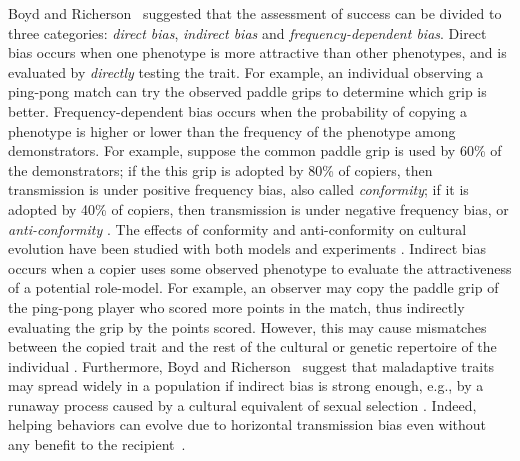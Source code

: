 \documentclass[12pt]{extarticle}
\begin{document}
Boyd and Richerson~\citep[Ch.~5]{evolutionBook} suggested that the assessment of success can be divided to three categories: \emph{direct bias}, \emph{indirect bias} and \emph{frequency-dependent bias}.
Direct bias occurs when one phenotype is more attractive than other phenotypes, and is evaluated by \emph{directly} testing the trait.
For example, an individual observing a ping-pong match can try the observed paddle grips to determine which grip is better.
Frequency-dependent bias occurs when the probability of copying a phenotype is higher or lower than the frequency of the phenotype among demonstrators. 
For example, suppose the common paddle grip is used by 60\% of the demonstrators; if the this grip is adopted by 80\% of copiers, then transmission is under positive frequency bias, also called \emph{conformity}; if it is adopted by 40\% of copiers, then transmission is under negative frequency bias, or \emph{anti-conformity} \citep{conformism}. 
The effects of conformity and anti-conformity on cultural evolution have been studied with both models \citep{Denton2020,Denton2021,Denton2022} and experiments \citep{negativeFrequency}.
Indirect bias occurs when a copier uses some observed phenotype to evaluate the attractiveness of a potential role-model. 
For example, an observer may copy the paddle grip of the ping-pong player who scored more points in the match, thus indirectly evaluating the grip by the points scored.
However, this may cause mismatches between the copied trait and the rest of the cultural or genetic repertoire of the individual \citep{Kolodny2022}.
Furthermore, Boyd and Richerson~\citep[Ch. 8]{evolutionBook} suggest that maladaptive traits may spread widely in a population if indirect bias is strong enough, e.g., by a runaway process caused by a cultural equivalent of sexual selection \citep{sexualSelectionBook}.
Indeed, helping behaviors can evolve due to horizontal transmission bias even without any benefit to the recipient~\citep{cooperation}.
\end{document}

